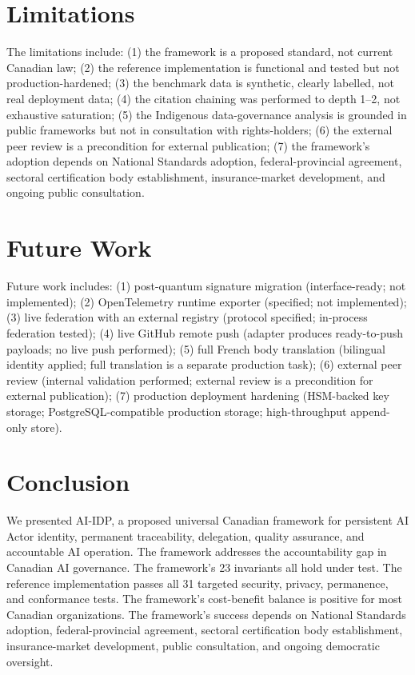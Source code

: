 \documentclass[11pt,a4paper]{article}
\begin{document}
\section{Limitations}
\label{sec:limitations}

The limitations include: (1) the framework is a proposed standard, not current Canadian law; (2) the reference implementation is functional and tested but not production-hardened; (3) the benchmark data is synthetic, clearly labelled, not real deployment data; (4) the citation chaining was performed to depth 1--2, not exhaustive saturation; (5) the Indigenous data-governance analysis is grounded in public frameworks but not in consultation with rights-holders; (6) the external peer review is a precondition for external publication; (7) the framework's adoption depends on National Standards adoption, federal-provincial agreement, sectoral certification body establishment, insurance-market development, and ongoing public consultation.

\section{Future Work}
\label{sec:future-work}

Future work includes: (1) post-quantum signature migration (interface-ready; not implemented); (2) OpenTelemetry runtime exporter (specified; not implemented); (3) live federation with an external registry (protocol specified; in-process federation tested); (4) live GitHub remote push (adapter produces ready-to-push payloads; no live push performed); (5) full French body translation (bilingual identity applied; full translation is a separate production task); (6) external peer review (internal validation performed; external review is a precondition for external publication); (7) production deployment hardening (HSM-backed key storage; PostgreSQL-compatible production storage; high-throughput append-only store).

\section{Conclusion}
\label{sec:conclusion}

We presented AI-IDP, a proposed universal Canadian framework for persistent AI Actor identity, permanent traceability, delegation, quality assurance, and accountable AI operation. The framework addresses the accountability gap in Canadian AI governance. The framework's 23 invariants all hold under test. The reference implementation passes all 31 targeted security, privacy, permanence, and conformance tests. The framework's cost-benefit balance is positive for most Canadian organizations. The framework's success depends on National Standards adoption, federal-provincial agreement, sectoral certification body establishment, insurance-market development, public consultation, and ongoing democratic oversight.
\end{document}
